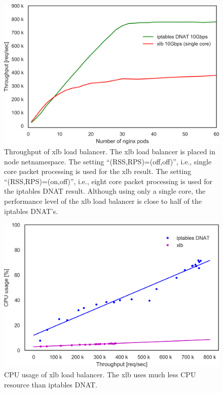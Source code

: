 \begin{figure}[h]
  \centering
  \includegraphics[width=0.8\columnwidth]{Figs/xlb_iptables_dnat_10g}
  \par\bigskip
  \centering
  \begin{minipage}{0.9\columnwidth}
    \caption[Throughput of xlb load balancer]{
      Throughput of xlb load balancer.
      The xlb load balancer is placed in node netnamespace.
      The setting \enquote{(RSS,RPS)=(off,off)}, i.e., single core packet processing is used for the xlb result.
      The setting \enquote{(RSS,RPS)=(on,off)}, i.e., eight core packet processing is used for the iptables DNAT result.
      Although using only a single core, the performance level of the xlb load balancer is close to half of the iptables DNAT's.
    }
    \label{fig:xlb_iptables_dnat_10g}
  \end{minipage}
\end{figure}


\begin{figure}[h]
  \centering
  \includegraphics[width=0.8\columnwidth]{Figs/cpu_usage_10g_xlb}
  \par\bigskip
  \centering
  \begin{minipage}{0.9\columnwidth}
    \caption[CPU usage of xlb load balancer]{
      CPU usage of xlb load balancer.
      The xlb uses much less CPU resource than iptables DNAT.
    }
    \label{fig:cpu_usage_10g_xlb}
  \end{minipage}
\end{figure}

